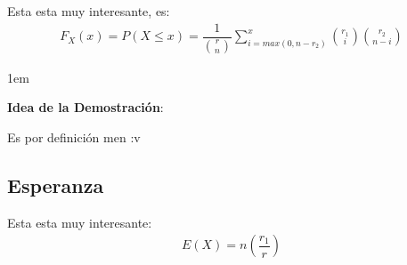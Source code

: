 \documentclass[12pt, fleqn]{report}                             %
\newenvironment{SmallIndentation}[1][0.75em]                    %
        {\begin{adjustwidth}{#1}{}\begin{footnotesize}}             %
        {\end{footnotesize}\end{adjustwidth}}                       %
\theoremstyle{break}                                            %
\newcommand{\Wrap}[1]           {\left( #1 \right)}             %
\newcommand{\pfrac}[2]      {\Wrap{\dfrac{#1}{#2}}}             %
\begin{document}
                Esta esta muy interesante, es:
                \begin{align*}
                    F_X(x) 
                        = P(X \leq x)              
                        = \dfrac{1}{\binom{r}{n}}
                            \displaystyle \sum_{i = max (0, n - r_2)}^x                
                                \binom{r_1}{i} \binom{r_2}{n - i}
                \end{align*}

                \begin{SmallIndentation}[1em]
                    \textbf{Idea de la Demostración}:
                    
                    Es por definición men :v
                
                \end{SmallIndentation}
                    


            \clearpage
            \subsection{Esperanza}

                Esta esta muy interesante:
                \begin{align*}
                    E(X) = n \pfrac{r_1}{r}                    
                \end{align*}
\end{document}
